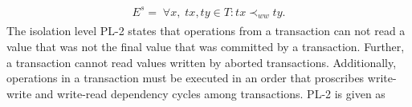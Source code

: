 \documentclass[acmlarge, ,11pt]{acmart}
\begin{document}
\begin{align}
\begin{split}
E^{s} =  \; \forall x, \; \mathit{tx}, \mathit{ty} \in T: 
\mathit{tx} \prec_{\mathit{ww}} \mathit{ty}. %
\end{split}
  \end{align}
The isolation level PL-2 states that operations from a transaction can not read a value that was not the final value that was
committed by a transaction. Further, a transaction cannot read values written by aborted transactions. Additionally,
operations in a transaction must be executed in an order
that proscribes write-write and write-read dependency cycles \cite{DBLP:conf/icde/AdyaLO00} among transactions. PL-2 is given as
\end{document}
